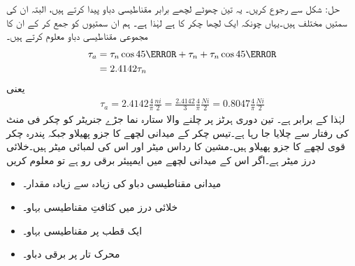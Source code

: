 حل: شکل   سے رجوع کریں۔ یہ تین چھوٹے لچھے برابر مقناطیسی دباو  پیدا کرتے ہیں، البتہ ان کی سمتیں مختلف ہیں۔یہاں چونکہ ایک لچھا   چکر کا ہے لہٰذا  ہے۔ ہم ان سمتیوں کو جمع کر کے ان کا مجموعی مقناطیسی دباو  معلوم کرتے ہیں۔
\begin{align*}
\tau_a&=\tau_n \cos 45\degree+\tau_n+\tau_n \cos 45\degree\\
&=2.4142 \tau_n
\end{align*}
یعنی
\begin{align*}
\tau_a=2.4142 \frac{4}{\pi}\frac{ni}{2}=\frac{2.4142}{3} \frac{4}{\pi}\frac{N i}{2}=0.8047 \frac{4}{\pi}\frac{N i}{2}
\end{align*}
لہٰذا  کے برابر ہے۔
%
تین دوری  ہرٹز پر چلنے والا ستارہ نما جڑے جنریٹر کو   چکر فی منٹ کی رفتار سے چلایا جا رہا ہے۔تیس چکر کے میدانی لچھے  کا جزو پھیلاو  جبکہ پندرہ چکر قوی لچھے کا جزو پھیلاو  ہیں۔مشین کا رداس  میٹر اور اس  کی لمبائی  میٹر ہیں۔خلائی درز  میٹر ہے۔اگر اس کے میدانی لچھے میں   ایمپیئر برقی رو ہے تو معلوم کریں
\begin{itemize}
\item
میدانی مقناطیسی دباو کی زیادہ سے زیادہ مقدار۔
\item
خلائی درز میں کثافتِ مقناطیسی بہاو۔
\item
ایک قطب پر مقناطیسی بہاو۔
\item
محرک تار پر برقی دباو۔
\end{itemize}

